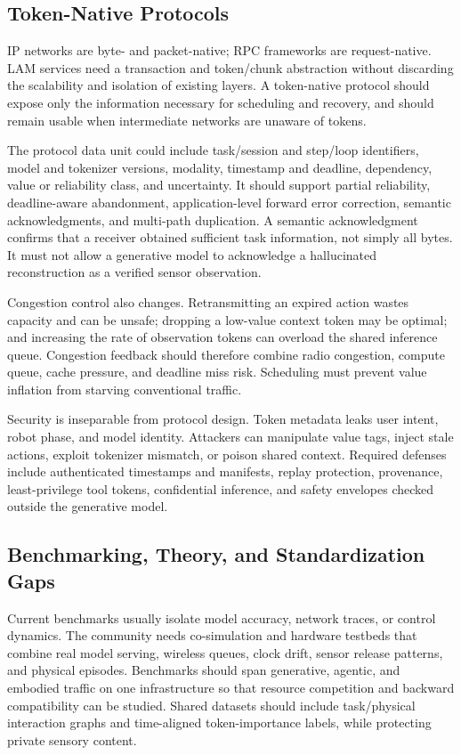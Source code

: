 \documentclass[letterpaper,journal]{IEEEtran}
\begin{document}
\subsection{Token-Native Protocols}
IP networks are byte- and packet-native; RPC frameworks are
request-native. LAM services need a transaction and token/chunk abstraction
without discarding the scalability and isolation of existing layers. A
token-native protocol should expose only the information necessary for
scheduling and recovery, and should remain usable when intermediate networks
are unaware of tokens.

The protocol data unit could include task/session and step/loop identifiers,
model and tokenizer versions, modality, timestamp and deadline, dependency,
value or reliability class, and uncertainty.
It should support partial reliability, deadline-aware abandonment,
application-level forward error correction, semantic acknowledgments, and
multi-path duplication. A semantic acknowledgment confirms that a receiver
obtained sufficient task information, not simply all bytes. It must not allow
a generative model to acknowledge a hallucinated reconstruction as a verified
sensor observation.

Congestion control also changes. Retransmitting an expired action wastes
capacity and can be unsafe; dropping a low-value context token may be optimal;
and increasing the rate of observation tokens can overload the shared
inference queue. Congestion feedback should therefore combine radio
congestion, compute queue, cache pressure, and deadline miss risk. Scheduling
must prevent value inflation from starving conventional traffic.

Security is inseparable from protocol design. Token metadata leaks user
intent, robot phase, and model identity. Attackers can manipulate value tags,
inject stale actions, exploit tokenizer mismatch, or poison shared context.
Required defenses include authenticated timestamps and manifests, replay
protection, provenance, least-privilege tool tokens, confidential inference,
and safety envelopes checked outside the generative model.

\subsection{Benchmarking, Theory, and Standardization Gaps}
Current benchmarks usually isolate model accuracy, network traces, or control
dynamics. The community needs co-simulation and hardware testbeds that combine
real model serving, wireless queues, clock drift, sensor release patterns, and
physical episodes. Benchmarks should span generative, agentic, and embodied
traffic on one infrastructure so that resource competition and backward
compatibility can be studied. Shared datasets should include task/physical
interaction graphs and time-aligned token-importance labels, while protecting
private sensory content.
\end{document}
